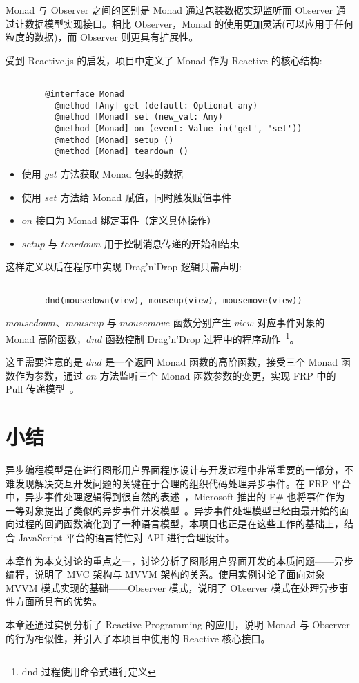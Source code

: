 Monad 与 Observer 之间的区别是 Monad 通过包装数据实现监听而 Observer 通过让数据模型实现接口。相比 Observer，Monad 的使用更加灵活(可以应用于任何粒度的数据)，而 Observer 则更具有扩展性。

受到 Reactive.js 的启发，项目中定义了 Monad 作为 Reactive 的核心结构:

\begin{verbatim}

        @interface Monad
          @method [Any] get (default: Optional-any)
          @method [Monad] set (new_val: Any)
          @method [Monad] on (event: Value-in('get', 'set'))
          @method [Monad] setup ()
          @method [Monad] teardown ()

\end{verbatim}

\begin{itemize}
  \item 使用 $get$ 方法获取 Monad 包装的数据
  \item 使用 $set$ 方法给 Monad 赋值，同时触发赋值事件
  \item $on$ 接口为 Monad 绑定事件（定义具体操作）
  \item $setup$ 与 $teardown$ 用于控制消息传递的开始和结束
\end{itemize}

这样定义以后在程序中实现 Drag'n'Drop 逻辑只需声明:

\begin{verbatim}

        dnd(mousedown(view), mouseup(view), mousemove(view))

\end{verbatim}

$mousedown$、$mouseup$ 与 $mousemove$ 函数分别产生 $view$ 对应事件对象的 Monad 高阶函数，$dnd$ 函数控制 Drag'n'Drop 过程中的程序动作~\footnote{dnd 过程使用命令式进行定义}。

这里需要注意的是 $dnd$ 是一个返回 Monad 函数的高阶函数，接受三个 Monad 函数作为参数，通过 $on$ 方法监听三个 Monad 函数参数的变更，实现 FRP 中的 Pull 传递模型~\cite{Elliott:2009:PFR:1596638.1596643}。

\section{小结}

异步编程模型是在进行图形用户界面程序设计与开发过程中非常重要的一部分，不难发现解决交互开发问题的关键在于合理的组织代码处理异步事件。在 FRP 平台中，异步事件处理逻辑得到很自然的表述~\cite{Wan:2002:EF:645772.667941}，Microsoft 推出的 F\# 也将事件作为一等对象提出了类似的异步事件开发模型~\cite{Syme:2011:FAP:1946313.1946334}。异步事件处理模型已经由最开始的面向过程的回调函数演化到了一种语言模型，本项目也正是在这些工作的基础上，结合 JavaScript 平台的语言特性对 API 进行合理设计。

本章作为本文讨论的重点之一，讨论分析了图形用户界面开发的本质问题——异步编程，说明了 MVC 架构与 MVVM 架构的关系。使用实例讨论了面向对象 MVVM 模式实现的基础——Observer 模式，说明了 Observer 模式在处理异步事件方面所具有的优势。

本章还通过实例分析了 Reactive Programming 的应用，说明 Monad 与 Observer 的行为相似性，并引入了本项目中使用的 Reactive 核心接口。

